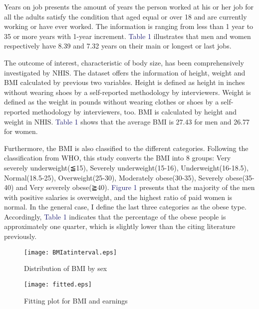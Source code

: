 \documentclass{article}
\begin{document}
\par
\setlength{\parindent}{2em}
Years on job presents the amount of years the person worked at his or her job for all the adults satisfy the condition that aged equal or over 18 and are currently working or have ever worked. The information is ranging from less than 1 year to 35 or more years with 1-year increment. \textcolor{MidnightBlue}{Table 1} illustrates that men and women respectively have 8.39 and 7.32 years on their main or longest or last jobs.
\par
\setlength{\parindent}{2em}
The outcome of interest, characteristic of body size, has been comprehensively investigated by NHIS. The dataset offers the information of height, weight and BMI calculated by previous two variables. Height is defined as height in inches without wearing shoes by a self-reported methodology by interviewers. Weight is defined as the weight in pounds without wearing clothes or shoes by a self-reported methodology by interviewers, too. BMI is calculated by height and weight in NHIS. \textcolor{MidnightBlue}{Table 1} shows that the average BMI is 27.43 for men and 26.77 for women.
\par
\setlength{\parindent}{2em}
Furthermore, the BMI is also classified to the different categories. Following the classification from WHO, this study converts the BMI into 8 groups: Very severely underweight(≦15), Severely underweight(15-16), Underweight(16-18.5), Normal(18.5-25), Overweight(25-30), Moderately obese(30-35), Severely obese(35-40) and Very severely obese(≧40). \textcolor{MidnightBlue}{Figure 1} presents that the majority of the men with positive salaries is overweight, and the highest ratio of paid women is normal. In the general case, I define the last three categories as the obese type. Accordingly, \textcolor{MidnightBlue}{Table 1} indicates that the percentage of the obese people is approximately one quarter, which is slightly lower than the citing literature previously.


\begin{figure}[htbp]
\centering
\begin{minipage}[t]{0.45\textwidth}
\centering
\texttt{[image: BMIatinterval.eps]}
    \caption{Distribution of BMI by sex}
\end{minipage}%
\begin{minipage}[t]{0.6\textwidth}
\centering
\texttt{[image: fitted.eps]}
\caption{Fitting plot for BMI and earnings}
\end{minipage}
\end{figure}
\end{document}
